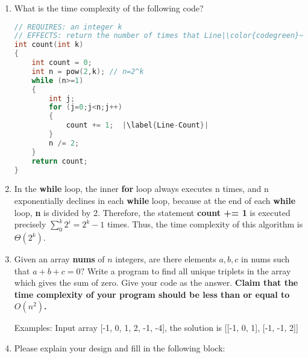\documentclass[12pt,a4paper]{article}
\makeatletter
\newtheorem*{solution}{Solution}
\theoremstyle{definition}
\renewenvironment{solution}[1][Solution] {\par\pushQED{\qed}\normalfont\topsep6\p@\@plus6\p@\relax\trivlist\item[\hskip\labelsep\bfseries#1\@addpunct{.}]\ignorespaces}{\popQED\endtrivlist\@endpefalse} \makeatother
\makeatother
\begin{document}
\begin{enumerate}

\item What is the time complexity of the following code?


\begin{lstlisting}[language=C++]
// REQUIRES: an integer k
// EFFECTS: return the number of times that Line|\color{codegreen}~\ref{Line-Count}| is executed
int count(int k)
{
	int count = 0;
	int n = pow(2,k); // n=2^k
	while (n>=1)
	{
		int j;
   		for (j=0;j<n;j++)
   		{
   			count += 1;  |\label{Line-Count}|	
   		}
   		n /= 2;
	}
	return count;
}
\end{lstlisting}



\begin{solution}
	In the \textbf{while} loop, the inner \textbf{for} loop always executes n times, and n exponentially declines in each \textbf{while} loop, because at the end of each \textbf{while} loop, \textbf{n} is divided by 2. Therefore, the statement \textbf{count += 1} is executed precisely $\sum_{0}^{k} 2^i = 2^k -1$ times. Thus, the time complexity of this algorithm is $\Theta(2^k)$.
\end{solution}


\item Given an array \textbf{nums} of $n$ integers, are there elements $a, b, c$ in nums such that $a + b + c = 0?$ Write a program to find all unique triplets in the array which gives the sum of zero. Give your code as the answer. \textbf{Claim that the time complexity of your program should be less than or equal to $O(n^2)$.}

{\color{purple}Examples: Input array [-1, 0, 1, 2, -1, -4], the solution is [[-1, 0, 1], [-1, -1, 2]]}



\begin{solution}
Please explain your design and fill in the following block:


\end{solution}
\end{enumerate}
\end{document}
